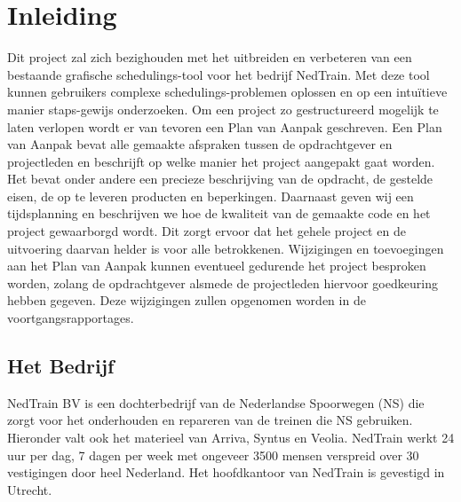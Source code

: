 \section{Inleiding}
Dit project zal zich bezighouden met het uitbreiden en verbeteren van een bestaande grafische schedulings-tool voor het bedrijf NedTrain. Met deze tool kunnen gebruikers complexe schedulings-problemen oplossen en op een intu\"itieve manier staps-gewijs onderzoeken. Om een project zo gestructureerd mogelijk te laten verlopen wordt er van tevoren een Plan van Aanpak geschreven. Een Plan van Aanpak bevat alle gemaakte afspraken tussen de opdrachtgever en projectleden en beschrijft op welke manier het project aangepakt gaat worden. Het bevat onder andere een precieze beschrijving van de opdracht, de gestelde eisen, de op te leveren producten en beperkingen. Daarnaast geven wij een tijdsplanning en beschrijven we hoe de kwaliteit van de gemaakte code en het project gewaarborgd wordt. Dit zorgt ervoor dat het gehele project en de uitvoering daarvan helder is voor alle betrokkenen. Wijzigingen en toevoegingen aan het Plan van Aanpak kunnen eventueel gedurende het project besproken worden, zolang de opdrachtgever alsmede de projectleden hiervoor goedkeuring hebben gegeven. Deze wijzigingen zullen opgenomen worden in de voortgangsrapportages.

\subsection{Het Bedrijf}
NedTrain BV is een dochterbedrijf van de Nederlandse Spoorwegen (NS) die zorgt voor het onderhouden en repareren van de treinen die NS gebruiken. Hieronder valt ook het materieel van Arriva, Syntus en Veolia. NedTrain werkt 24 uur per dag, 7 dagen per week met ongeveer 3500 mensen verspreid over 30 vestigingen door heel Nederland. Het hoofdkantoor van NedTrain is gevestigd in Utrecht. 

